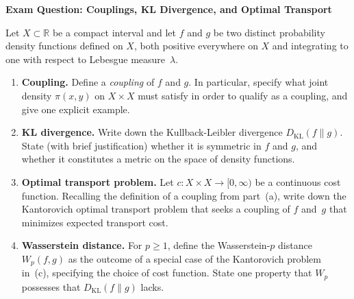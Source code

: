 \documentclass[12pt]{article}
\begin{document}
\begin{center}
  {\large\bfseries Exam Question: Couplings, KL Divergence, and Optimal Transport}
\end{center}

\bigskip

Let $X \subset \mathbb{R}$ be a compact interval and let $f$ and $g$ be two
distinct probability density functions defined on $X$, both positive everywhere
on $X$ and integrating to one with respect to Lebesgue measure~$\lambda$.
\begin{enumerate}
  \item[\textbf{(a)}] \textbf{Coupling.}  Define a \emph{coupling} of $f$ and $g$.
    In particular, specify what joint density $\pi(x,y)$ on $X \times X$ must
    satisfy in order to qualify as a coupling, and give one explicit example.

  \item[\textbf{(b)}] \textbf{KL divergence.}  Write down the
    Kullback-Leibler divergence $D_{\mathrm{KL}}(f \| g)$.
    State (with brief justification) whether it is symmetric in $f$ and $g$,
    and whether it constitutes a metric on the space of density functions.

  \item[\textbf{(c)}] \textbf{Optimal transport problem.}  Let $c: X \times X
    \to [0,\infty)$ be a continuous cost function.  Recalling the definition
    of a coupling from part~(a), write down the Kantorovich optimal transport
    problem that seeks a coupling of $f$ and~$g$ that minimizes expected
    transport cost.

  \item[\textbf{(d)}] \textbf{Wasserstein distance.}  For $p \geq 1$, define
    the Wasserstein-$p$ distance $W_p(f,g)$ as the outcome of a  special case of the
    Kantorovich problem in~(c), specifying the choice of cost function.
    State one property that $W_p$ possesses that $D_{\mathrm{KL}}(f\|g)$ lacks.
\end{enumerate}
\end{document}
